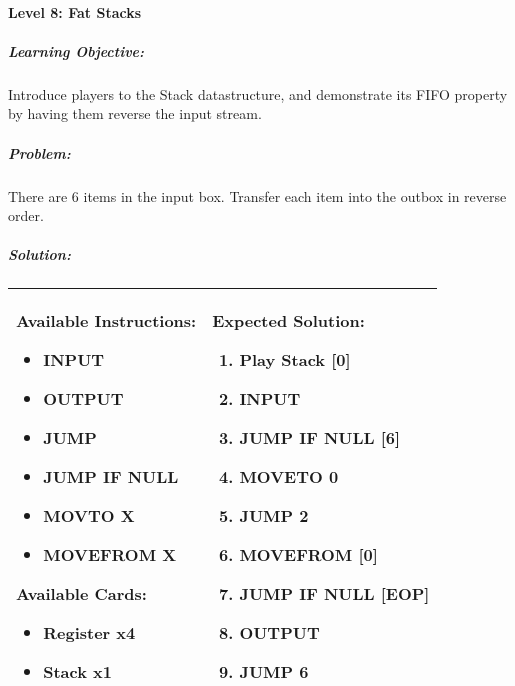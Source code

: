 \paragraph{Level 8: Fat Stacks}
\subparagraph{Learning Objective:} Introduce players to the Stack datastructure, and demonstrate its FIFO property by having them reverse the input stream.

\subparagraph{Problem:} There are 6 items in the input box. Transfer each item into the outbox in reverse order.

\subparagraph{Solution:} 
\begin{center}
    \begin{tabular}{ | m{5cm} | m{9cm} | } 
        \hline
            \textbf{Available Instructions:} 
            \begin{itemize}
                \setlength\itemsep{-.35em}
                \item INPUT
                \item OUTPUT
                \item JUMP
                \item JUMP IF NULL
                \item MOVTO X
                \item MOVEFROM X
            \end{itemize}
            \textbf{Available Cards:} 
            \begin{itemize}
                \setlength\itemsep{-.35em}
                \item Register x4
                \item Stack x1
            \end{itemize}& 
            \textbf{Expected Solution:} 
            \begin{enumerate}
                \setlength\itemsep{-.35em}
                \item Play Stack [0]
                \item INPUT
                \item JUMP IF NULL [6]
                \item MOVETO 0
                \item JUMP 2
                \item MOVEFROM [0]
                \item JUMP IF NULL [EOP]
                \item OUTPUT
                \item JUMP 6
            \end{enumerate}
            \\
        \hline
    \end{tabular}
\end{center}

